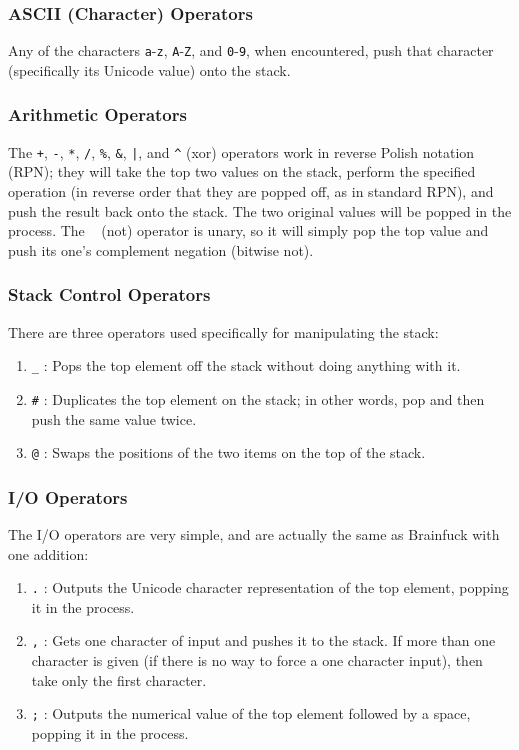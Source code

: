 \documentclass{article}
\begin{document}
\subsubsection{ASCII (Character) Operators}
Any of the characters \texttt{a}-\texttt{z}, \texttt{A}-\texttt{Z}, and \texttt{0}-\texttt{9}, when encountered, push that character (specifically its Unicode value) onto the stack.
\subsubsection{Arithmetic Operators}
The \texttt{+}, \texttt{-}, \texttt{*}, \texttt{/}, \texttt{\%}, \texttt{\&}, \texttt{|}, and \texttt{\^{}} (xor) operators work in reverse Polish notation (RPN); they will take the top two values on the stack, perform the specified operation (in reverse order that they are popped off, as in standard RPN), and push the result back onto the stack. The two original values will be popped in the process. The \texttt{~} (not) operator is unary, so it will simply pop the top value and push its one's complement negation (bitwise not).
\subsubsection{Stack Control Operators}
There are three operators used specifically for manipulating the stack:
\begin{enumerate}
	\item \texttt{\_} : Pops the top element off the stack without doing anything with it.
	\item \texttt{\#} : Duplicates the top element on the stack; in other words, pop and then push the same value twice.
	\item \texttt{@} : Swaps the positions of the two items on the top of the stack.
\end{enumerate}
\subsubsection{I/O Operators}
The I/O operators are very simple, and are actually the same as Brainfuck with one addition:
\begin{enumerate}
	\item \texttt{.} : Outputs the Unicode character representation of the top element, popping it in the process.
	\item \texttt{,} : Gets one character of input and pushes it to the stack. If more than one character is given (if there is no way to force a one character input), then take only the first character.
	\item \texttt{;} : Outputs the numerical value of the top element followed by a space, popping it in the process.
\end{enumerate}
\end{document}
